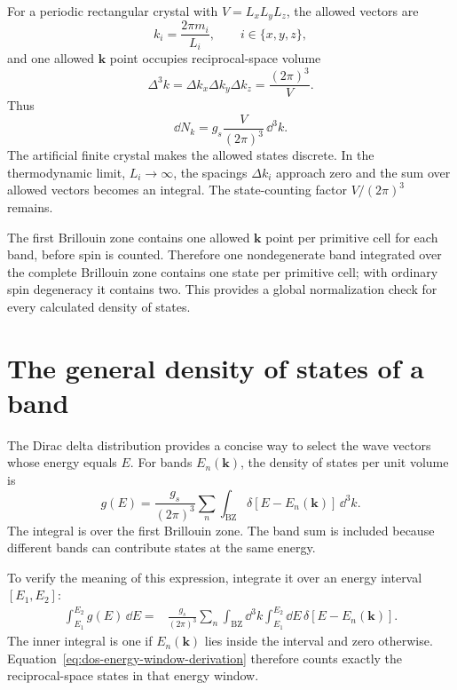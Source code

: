 For a periodic rectangular crystal with
$V=L_xL_yL_z$, the allowed vectors are
\begin{equation}
  k_i=\frac{2\pi m_i}{L_i},
  \qquad i\in\{x,y,z\},
  \label{eq:dos-three-dimensional-k-grid}
\end{equation}
and one allowed $\bm k$ point occupies reciprocal-space volume
\begin{equation}
  \Delta^3k
  =\Delta k_x\Delta k_y\Delta k_z
  =\frac{(2\pi)^3}{V}.
  \label{eq:dos-reciprocal-cell-volume}
\end{equation}
Thus
\begin{equation}
  \dd N_k
  =g_s\frac{V}{(2\pi)^3}\,\dd^3k.
  \label{eq:dos-three-dimensional-state-count}
\end{equation}
The artificial finite crystal makes the allowed states discrete.  In the
thermodynamic limit, $L_i\rightarrow\infty$, the spacings $\Delta k_i$ approach
zero and the sum over allowed vectors becomes an integral.  The state-counting
factor $V/(2\pi)^3$ remains.

\begin{modelcheck}
The first Brillouin zone contains one allowed $\bm k$ point per primitive cell
for each band, before spin is counted.  Therefore one nondegenerate band
integrated over the complete Brillouin zone contains one state per primitive
cell; with ordinary spin degeneracy it contains two.  This provides a global
normalization check for every calculated density of states.
\end{modelcheck}

\section{The general density of states of a band}

The Dirac delta distribution provides a concise way to select the wave vectors
whose energy equals $E$.  For bands $E_n(\bm k)$, the density of states per unit
volume is
\begin{equation}
  \boxed{
  g(E)
  =\frac{g_s}{(2\pi)^3}
   \sum_n\int_{\mathrm{BZ}}
   \delta\!\left[E-E_n(\bm k)\right] \,\dd^3k.
  }
  \label{eq:general-band-density-of-states}
\end{equation}
The integral is over the first Brillouin zone.  The band sum is included because
different bands can contribute states at the same energy.

To verify the meaning of this expression, integrate it over an energy interval
$[E_1,E_2]$:
\begin{equation}
\begin{aligned}
  \int_{E_1}^{E_2}g(E)\,\dd E
  ={}&\frac{g_s}{(2\pi)^3}\sum_n
  \int_{\mathrm{BZ}}\dd^3k
  \int_{E_1}^{E_2}\dd E\,
  \delta\!\left[E-E_n(\bm k)\right].
\end{aligned}
  \label{eq:dos-energy-window-derivation}
\end{equation}
The inner integral is one if $E_n(\bm k)$ lies inside the interval and zero
otherwise.  Equation~\eqref{eq:dos-energy-window-derivation} therefore counts
exactly the reciprocal-space states in that energy window.

